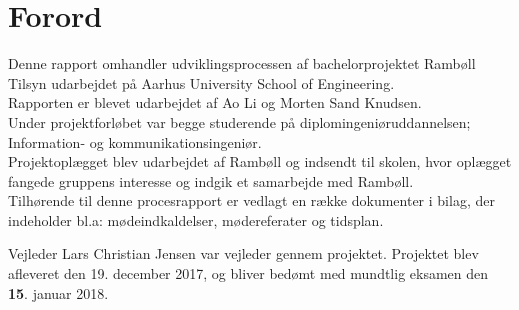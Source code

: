 \chapter*{Forord}
Denne rapport omhandler udviklingsprocessen af bachelorprojektet Rambøll Tilsyn udarbejdet på Aarhus University School of Engineering. \\
Rapporten er blevet udarbejdet af Ao Li og Morten Sand Knudsen. \\ 
Under projektforløbet var begge studerende på diplomingeniøruddannelsen; Information- og kommunikationsingeniør. \\
Projektoplægget blev udarbejdet af Rambøll og indsendt til skolen, hvor oplægget fangede gruppens interesse og indgik et samarbejde med Rambøll. \\
Tilhørende til denne procesrapport er vedlagt en række dokumenter i bilag, der indeholder bl.a: mødeindkaldelser,
mødereferater og tidsplan. 

Vejleder Lars Christian Jensen var vejleder gennem projektet. Projektet blev afleveret den 19.
december 2017, og bliver bedømt med mundtlig eksamen den \textbf{15}. januar 2018.